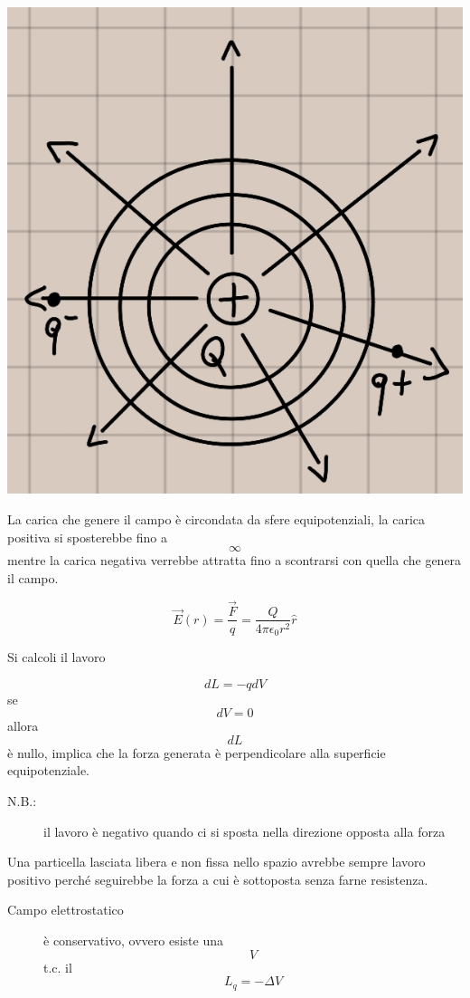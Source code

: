 \documentclass[a4paper, 12pt]{book}
\theoremstyle{plain}
\begin{document}
\begin{center}
	\includegraphics[width=1\textwidth]{equi.jpg}
\end{center}

La carica che genere il campo è circondata da sfere equipotenziali, la carica positiva si sposterebbe fino a \[\infty\] mentre la carica negativa verrebbe attratta fino a scontrarsi con quella che genera il campo.

\[\vec{E}(r) = \frac{\vec{F}}{q} = \frac{Q}{4\pi \epsilon_0 r^2}\hat{r}\]

Si calcoli il lavoro

\[dL = -qdV\] se \[dV = 0\] allora \[dL\] è nullo, implica che la forza generata è perpendicolare alla superficie equipotenziale.

\begin{description}
	\item[N.B.:] il lavoro è negativo quando ci si sposta nella direzione opposta alla forza
\end{description}

Una particella lasciata libera e non fissa nello spazio avrebbe sempre lavoro positivo perché seguirebbe la forza a cui è sottoposta senza farne resistenza.

\begin{description}
	\item[Campo elettrostatico] è conservativo, ovvero esiste una \[V\] t.c. il \[L_q = -\Delta V\]
\end{description}
\end{document}
